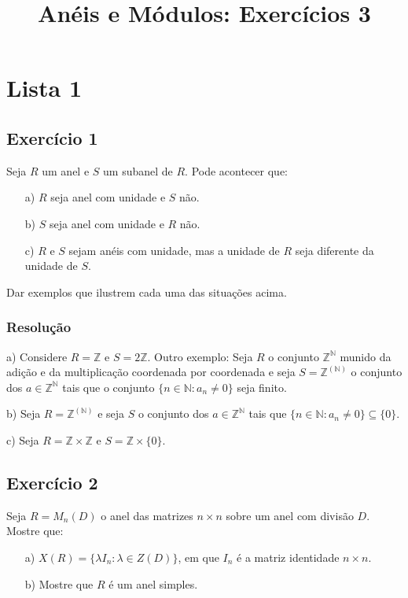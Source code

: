 \documentclass[10pt,a4paper]{article}
\title{Anéis e Módulos: Exercícios 3}
\author{}
\date{}
\begin{document}
\maketitle

\newpage

\section*{Lista 1}

\subsection*{Exercício 1}

Seja $R$ um anel e $S$ um subanel de $R$. Pode acontecer que:
\begin{itemize}
\item[a)] $R$ seja anel com unidade e $S$ não.
\item[b)] $S$ seja anel com unidade e $R$ não.
\item[c)] $R$ e $S$ sejam anéis com unidade, mas a unidade de $R$ seja diferente da unidade de $S$.
\end{itemize}
Dar exemplos que ilustrem cada uma das situações acima.

\subsubsection*{Resolução}

a) Considere $R=\mathbb{Z}$ e $S=2\mathbb{Z}$. Outro exemplo: Seja $R$ o conjunto $\mathbb{Z}^\mathbb{N}$ munido da adição e da multiplicação coordenada por coordenada e seja $S=\mathbb{Z}^{(\mathbb{N})}$ o conjunto dos $a\in\mathbb{Z}^\mathbb{N}$ tais que o conjunto $\{n\in\mathbb{N}:a_n\neq 0\}$ seja finito.

\medskip
\noindent
b) Seja $R=\mathbb{Z}^{(\mathbb{N})}$ e seja $S$ o conjunto dos $a\in\mathbb{Z}^\mathbb{N}$ tais que $\{n\in\mathbb{N}:a_n\neq 0\}\subseteq\{0\}$.

\medskip
\noindent
c) Seja $R=\mathbb{Z}\times\mathbb{Z}$ e $S=\mathbb{Z}\times\{0\}$.

\subsection*{Exercício 2}

Seja $R=M_n(D)$ o anel das matrizes $n\times n$ sobre um anel com divisão $D$. Mostre que:
\begin{itemize}
\item[a)] $X(R)=\{\lambda I_n:\lambda\in Z(D)\}$, em que $I_n$ é a matriz identidade $n\times n$.
\item[b)] Mostre que $R$ é um anel simples.
\end{itemize}
\end{document}
